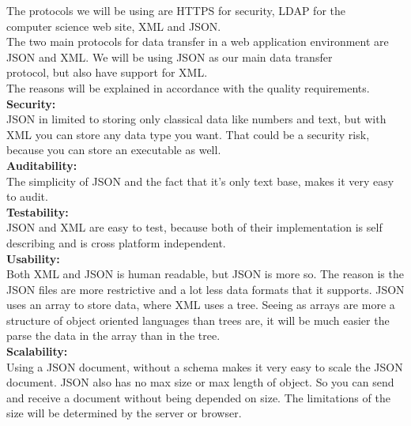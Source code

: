 \documentclass[12pt]{article}
\begin{document}
		The protocols we will be using are HTTPS for security, LDAP for the \\ computer science web site, XML 		and JSON. \\
		\linebreak
		The two main protocols for data transfer in a web application environment are JSON and XML. We will be 	using JSON as our main data transfer \\ protocol, but also have support for XML. \\
		The reasons will be explained in accordance with the quality requirements.
		\\\linebreak
		 \textbf{Security:}
		\\\linebreak
		JSON in limited to storing only classical data like numbers and text, but with XML you can store any 		data type you want. That could be a security risk, because you can store an executable as well.
		\\\linebreak
		\textbf{Auditability:}
		\\\linebreak
		The simplicity of JSON and the fact that it’s only text base, makes it very easy to audit.
		\\\linebreak
		\textbf{Testability:}
		\\\linebreak
		JSON and XML are easy to test, because both of their implementation is self describing and is cross 		platform independent.
		\\\linebreak
		\textbf{Usability:}
		\\\linebreak
		Both XML and JSON is human readable, but JSON is more so. The reason is the JSON files are more 			restrictive and a lot less data formats that it supports. JSON uses an array to store data, where XML 		uses a tree. Seeing as arrays are more a structure of object oriented languages than trees are, it 			will be much easier the parse the data in the array than in the tree. 
		\\\linebreak
		\textbf{Scalability:}
		\\\linebreak
		Using a JSON document, without a schema makes it very easy to scale the JSON document. JSON also has 		no max size or max length of object. So you can send and receive a document without being depended on 		size. The limitations of the size will be determined by the server or browser. 
\end{document}
